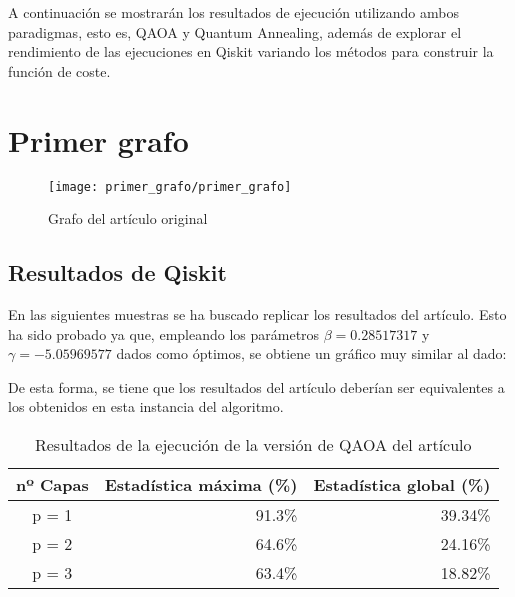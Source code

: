 \documentclass{article}
\begin{document}
A continuación se mostrarán los resultados de ejecución utilizando ambos paradigmas, esto es, QAOA y Quantum Annealing, además de explorar el rendimiento de las ejecuciones en Qiskit variando los métodos para construir la función de coste.

\newpage
\section{Primer grafo}
\label{sec:primer-grafo}

\begin{figure}[htbp]
  \centering
  \texttt{[image: primer\_grafo/primer\_grafo]}
  \caption{Grafo del artículo original} \label{fig:primer_grafo/primer_grafo}
\end{figure}

\subsection{Resultados de Qiskit}
\label{sec:resultados-de-qiskit}

En las siguientes muestras se ha buscado replicar los resultados del artículo. Esto ha sido probado ya que, empleando los parámetros \(\beta = 0.28517317\) y \(\gamma = -5.05969577 \) dados como óptimos, se obtiene un gráfico muy similar al dado: \\

\begin{figure}[htbp]
  \centering
  \caption{} \label{fig:primer_grafo/sin_restriccion_extra/primer_paper_aer_resultado}
\end{figure}

De esta forma, se tiene que los resultados del artículo deberían ser equivalentes a los obtenidos en esta instancia del algoritmo.

\begin{table}[htbp]
  \centering
  \begin{tabular}{|c|r|r|}
    \hline
    \textbf{nº Capas} & \textbf{Estadística máxima (\%)} & \textbf{Estadística global (\%)} \\ \hline
    p = 1 & 91.3\% & 39.34\% \\ \hline
    p = 2 & 64.6\% & 24.16\% \\ \hline
    p = 3 & 63.4\% & 18.82\% \\ \hline
  \end{tabular}
  \caption{Resultados de la ejecución de la versión de QAOA del artículo}
  \label{tab:primer_paper_aer_estadisticas}
\end{table}
\end{document}
